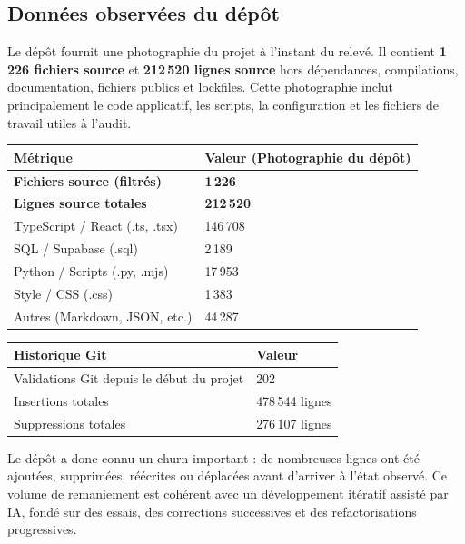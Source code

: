 \documentclass[
  10pt,
  a4paper,
  DIV=11,
  numbers=noendperiod,
  oneside]{scrreprt}
\newcounter{none} %
\let\oldtextbf\textbf
\renewcommand{\textbf}[1]{\oldtextbf{\textcolor{cmmnavy}{#1}}}
\begin{document}
\subsection{Données observées du
dépôt}\label{donnuxe9es-observuxe9es-du-duxe9puxf4t}

Le dépôt fournit une photographie du projet à l'instant du relevé. Il
contient \textbf{1\,226 fichiers source} et \textbf{212\,520 lignes
source} hors dépendances, compilations, documentation, fichiers publics
et lockfiles. Cette photographie inclut principalement le code
applicatif, les scripts, la configuration et les fichiers de travail
utiles à l'audit.

{\def\LTcaptype{none} %
\begin{longtable}[]{@{}ll@{}}
\toprule\noalign{}
Métrique & Valeur (Photographie du dépôt) \\
\midrule\noalign{}
\endhead
\bottomrule\noalign{}
\endlastfoot
\textbf{Fichiers source (filtrés)} & \textbf{1\,226} \\
\textbf{Lignes source totales} & \textbf{212\,520} \\
TypeScript / React (.ts, .tsx) & 146\,708 \\
SQL / Supabase (.sql) & 2\,189 \\
Python / Scripts (.py, .mjs) & 17\,953 \\
Style / CSS (.css) & 1\,383 \\
Autres (Markdown, JSON, etc.) & 44\,287 \\
\end{longtable}
}

{\def\LTcaptype{none} %
\begin{longtable}[]{@{}ll@{}}
\toprule\noalign{}
Historique Git & Valeur \\
\midrule\noalign{}
\endhead
\bottomrule\noalign{}
\endlastfoot
Validations Git depuis le début du projet & 202 \\
Insertions totales & 478\,544 lignes \\
Suppressions totales & 276\,107 lignes \\
\end{longtable}
}

Le dépôt a donc connu un churn important : de nombreuses lignes ont été
ajoutées, supprimées, réécrites ou déplacées avant d'arriver à l'état
observé. Ce volume de remaniement est cohérent avec un développement
itératif assisté par IA, fondé sur des essais, des corrections
successives et des refactorisations progressives.
\end{document}
